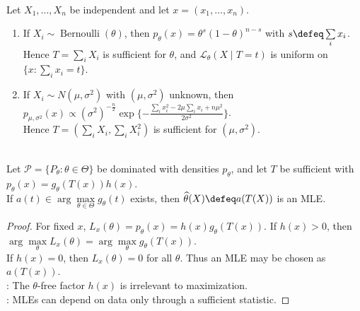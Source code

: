 \begin{example} \label{ex:bernoulli-normal-sufficient-statistics} \\
Let $X_1,\ldots,X_n$ be independent and let $x=(x_1,\ldots,x_n)$.
\begin{enumerate}[label=(\roman*)]
\setlength{\itemsep}{0pt}
\item If $X_i\sim\operatorname{Bernoulli}(\theta)$, then $p_\theta(x)=\theta^s(1-\theta)^{n-s}$ with $s\defeq\sum\limits_i x_i$.\\
Hence $T=\sum\limits_iX_i$ is sufficient for $\theta$, and $\mathcal{L}_\theta(X\mid T=t)$ is uniform on $\{x:\sum\limits_i x_i=t\}$.
\item If $X_i\sim N(\mu,\sigma^2)$ with $(\mu,\sigma^2)$ unknown, then $p_{\mu,\sigma^2}(x)\propto(\sigma^2)^{-\frac{n}{2}}\exp\{-\frac{\sum\limits_i x_i^2-2\mu\sum\limits_i x_i+n\mu^2}{2\sigma^2}\}$.\\
Hence $T=(\sum\limits_iX_i,\sum\limits_iX_i^2)$ is sufficient for $(\mu,\sigma^2)$.
\end{enumerate}
\end{example}

\begin{corollary} \label{cor:mle-function-of-sufficient-statistic} \\
Let $\mathcal{P}=\{P_\theta:\theta\in\Theta\}$ be dominated with densities $p_\theta$, and let $T$ be sufficient with $p_\theta(x)=g_\theta(T(x))h(x)$.\\
If $a(t)\in\arg\max\limits_{\theta\in\Theta}g_\theta(t)$ exists, then $\widehat{\theta}(X)\defeq a(T(X))$ is an MLE.
\begin{proof}
For fixed $x$, $L_x(\theta)=p_\theta(x)=h(x)g_\theta(T(x))$. If $h(x)>0$, then $\arg\max\limits_\theta L_x(\theta)=\arg\max\limits_\theta g_\theta(T(x))$.\\
If $h(x)=0$, then $L_x(\theta)=0$ for all $\theta$. Thus an MLE may be chosen as $a(T(x))$.\\
: The $\theta$-free factor $h(x)$ is irrelevant to maximization.\\
: MLEs can depend on data only through a sufficient statistic.
\end{proof}
\end{corollary}

